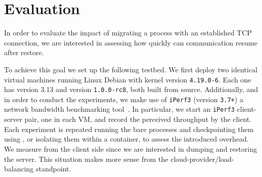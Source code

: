 \section{Evaluation} \label{sec:evaluation}

In order to evaluate the impact of migrating a process with an established TCP connection, we are interested in assessing how quickly can communication resume after restore.

To achieve this goal we set up the following testbed.
We first deploy two identical virtual machines running Linux Debian with kernel version \texttt{4.19.0-6}.
Each one has \criu version 3.13 and \runc version \texttt{1.0.0-rc8}, both built from source.
Additionally, and in order to conduct the experiments, we make use of \texttt{iPerf3} (version \texttt{3.7+}) a network bandwidth benchmarking tool~\cite{iperf3}.
In particular, we start an \texttt{iPerf3} client-server pair, one in each VM, and record the perceived throughput by the client.
Each experiment is repeated running the bare processes and checkpointing them using \criu, or isolating them within a \runc container, to assess the introduced overhead.
We measure from the client side since we are interested in dumping and restoring the server.
This situation makes more sense from the cloud-provider/load-balancing standpoint.

